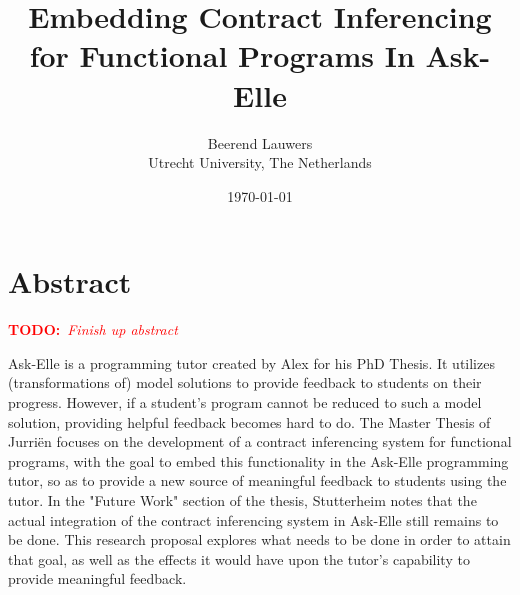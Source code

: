 \documentclass[10pt,a4paper]{article}
\author{
	Beerend Lauwers\\
	Utrecht University, The Netherlands}
\date{\today}
\title{Embedding Contract Inferencing for Functional Programs In Ask-Elle}
\newcommand{\annotate}[3]{
	\begin{scriptsize}
	\textcolor{#1}{\textbf{#2}~\textit{#3}}
	\end{scriptsize}\newline}
\newcommand{\todo}[1]{\annotate{red} {TODO:} {#1}}
\begin{document}
\maketitle


\section{Abstract}
\todo{Finish up abstract}
Ask-Elle is a programming tutor created by Alex \citet{Gerdes:2012:phd} for his PhD Thesis. It utilizes (transformations of) model solutions to provide feedback to students on their progress.
However, if a student's program cannot be reduced to such a model solution, providing helpful feedback becomes hard to do. 
The Master Thesis of Jurri\"en \citet{Stutterheim:2013:thesis} focuses on the development of a contract inferencing system for functional programs, with the goal to embed this functionality in the Ask-Elle programming tutor, so as to provide a new source of meaningful feedback to students using the tutor.
In the "Future Work" section of the thesis, Stutterheim notes that the actual integration of the contract inferencing system in Ask-Elle still remains to be done.
This research proposal explores what needs to be done in order to attain that goal, as well as the effects it would have upon the tutor's capability to provide meaningful feedback.
\end{document}
